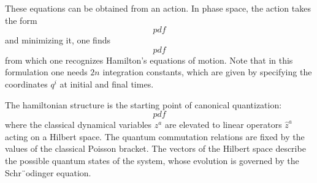 These equations can be obtained from an action. In phase space, the action takes the form
\[
    pdf
\]
and minimizing it, one finds
\[
    pdf
\]
from which one recognizes Hamilton’s equations of motion. Note that in this formulation one needs \(2n\) integration constants, which are given by specifying the coordinates \(q^i\) at initial and final times.

The hamiltonian structure is the starting point of canonical quantization:
\[
    pdf
\]
where the classical dynamical variables \(z^a\) are elevated to linear operators \(\hat{z}^a\) acting on a Hilbert space. The quantum commutation relations are fixed by the values of the classical Poisson bracket. The vectors of the Hilbert space describe the possible quantum states of the system, whose evolution is governed by the Schr¨odinger equation.